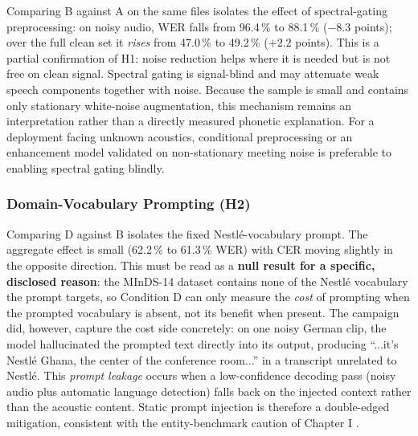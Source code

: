 \documentclass[12pt]{report}
\begin{document}
Comparing B against A on the same files isolates the effect of spectral-gating preprocessing: on noisy audio, WER falls from 96.4\,\% to 88.1\,\% ($-8.3$ points); over the full clean set it \emph{rises} from 47.0\,\% to 49.2\,\% ($+2.2$ points). This is a partial confirmation of H1: noise reduction helps where it is needed but is not free on clean signal. Spectral gating is signal-blind and may attenuate weak speech components together with noise. Because the sample is small and contains only stationary white-noise augmentation, this mechanism remains an interpretation rather than a directly measured phonetic explanation. For a deployment facing unknown acoustics, conditional preprocessing or an enhancement model validated on non-stationary meeting noise is preferable to enabling spectral gating blindly.
\subsubsection{Domain-Vocabulary Prompting (H2)}
Comparing D against B isolates the fixed Nestl\'e-vocabulary prompt. The aggregate effect is small (62.2\,\% to 61.3\,\% WER) with CER moving slightly in the opposite direction. This must be read as a \textbf{null result for a specific, disclosed reason}: the MInDS-14 dataset contains none of the Nestl\'e vocabulary the prompt targets, so Condition D can only measure the \emph{cost} of prompting when the prompted vocabulary is absent, not its benefit when present. The campaign did, however, capture the cost side concretely: on one noisy German clip, the model hallucinated the prompted text directly into its output, producing \enquote{...it's Nestl\'e Ghana, the center of the conference room...} in a transcript unrelated to Nestl\'e. This \emph{prompt leakage} occurs when a low-confidence decoding pass (noisy audio plus automatic language detection) falls back on the injected context rather than the acoustic content. Static prompt injection is therefore a double-edged mitigation, consistent with the entity-benchmark caution of Chapter I \cite{durmus2026contextual}.
\end{document}
